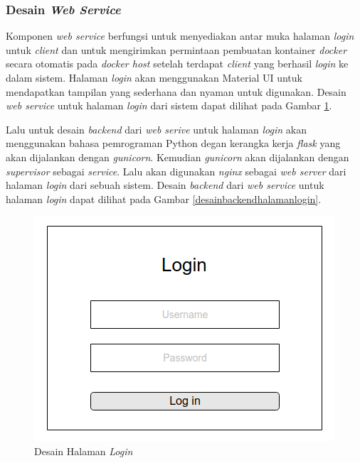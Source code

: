 	\subsubsection{Desain \textit{Web Service}}
	Komponen \textit{web service} berfungsi untuk menyediakan antar muka halaman \textit{login} untuk \textit{client} dan untuk mengirimkan permintaan pembuatan kontainer \textit{docker} secara otomatis pada \textit{docker host} setelah terdapat \textit{client} yang berhasil \textit{login} ke dalam sistem. Halaman \textit{login} akan menggunakan Material UI untuk mendapatkan tampilan yang sederhana dan nyaman untuk digunakan. Desain \textit{web service} untuk halaman \textit{login} dari sistem dapat dilihat pada Gambar \ref{mockuplogin}.
	
	Lalu untuk desain \textit{backend} dari \textit{web serive} untuk halaman \textit{login} akan menggunakan bahasa pemrograman Python degan kerangka kerja \textit{flask} yang akan dijalankan dengan \textit{gunicorn}. Kemudian \textit{gunicorn} akan dijalankan dengan \textit{supervisor} sebagai \textit{service}. Lalu akan digunakan \textit{nginx} sebagai \textit{web server} dari halaman \textit{login} dari sebuah sistem. Desain \textit{backend} dari \textit{web service} untuk halaman \textit{login} dapat dilihat pada Gambar \ref{desainbackendhalamanlogin}.
	
	\begin{figure}[H]
		\centering
		\includegraphics[width=\linewidth]{images/bab3/MockupLogin}
		\caption{Desain Halaman \textit{Login}}
		\label{mockuplogin}
	\end{figure}
	
